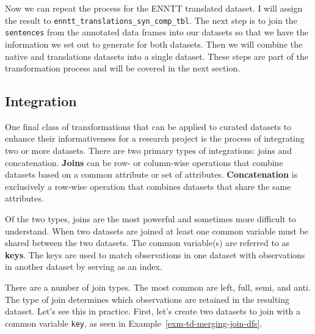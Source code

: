 \documentclass[
  letterpaper,
]{latex/krantz}
\theoremstyle{definition}
\theoremstyle{remark}
\begin{document}
Now we can repeat the process for the ENNTT translated dataset. I will
assign the result to \texttt{enntt\_translations\_syn\_comp\_tbl}. The
next step is to join the \texttt{sentences} from the annotated data
frames into our datasets so that we have the information we set out to
generate for both datasets. Then we will combine the native and
translations datasets into a single dataset. These steps are part of the
transformation process and will be covered in the next section.

\subsection{Integration}\label{sec-td-integration}

One final class of transformations that can be applied to curated
datasets to enhance their informativeness for a research project is the
process of integrating two or more datasets. There are two primary types
of integrations: joins and concatenation. \textbf{Joins} can be row- or
column-wise operations that combine datasets based on a common attribute
or set of attributes. \textbf{Concatenation} is exclusively a row-wise
operation that combines datasets that share the same attributes.

Of the two types, joins are the most powerful and sometimes more
difficult to understand. When two datasets are joined at least one
common variable must be shared between the two datasets. The common
variable(s) are referred to as \textbf{keys}. The keys are used to match
observations in one dataset with observations in another dataset by
serving as an index.

There are a number of join types. The most common are left, full, semi,
and anti. The type of join determines which observations are retained in
the resulting dataset. Let's see this in practice. First, let's create
two datasets to join with a common variable \texttt{key}, as seen in
Example~\ref{exm-td-merging-join-dfs}.
\end{document}
